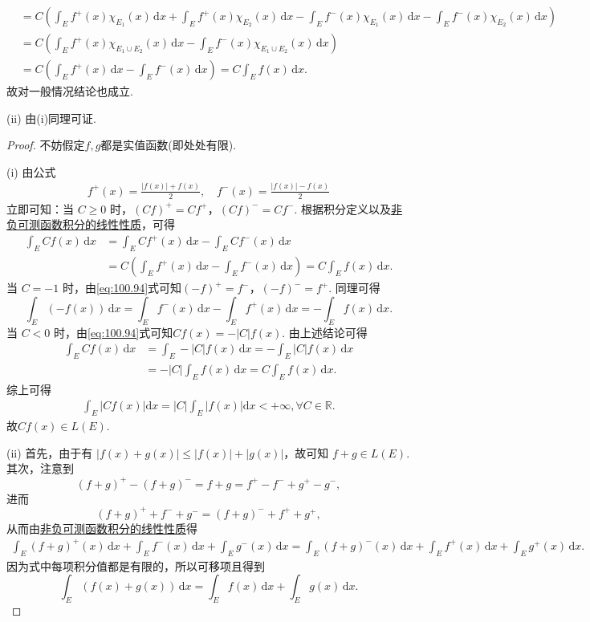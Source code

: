 \documentclass[../../main.tex]{subfiles}
\begin{document}
\begin{remark}
\begin{align*}
&= C \left( \int_E f^+(x) \chi_{E_1}(x) \, \mathrm{d}x + \int_E f^+(x) \chi_{E_2}(x) \, \mathrm{d}x - \int_E f^-(x) \chi_{E_1}(x) \, \mathrm{d}x - \int_E f^-(x) \chi_{E_2}(x) \, \mathrm{d}x \right) \\
&= C \left( \int_E f^+(x) \chi_{E_1 \cup E_2}(x) \, \mathrm{d}x - \int_E f^-(x) \chi_{E_1 \cup E_2}(x) \, \mathrm{d}x \right) \\
&= C \left( \int_E f^+(x) \, \mathrm{d}x - \int_E f^-(x) \, \mathrm{d}x \right) = C \int_E f(x) \, \mathrm{d}x.
\end{align*}
故对一般情况结论也成立.

(ii) 由(i)同理可证.
\end{remark}
\begin{proof}
不妨假定$f,g$都是实值函数(即处处有限).

(i) 由公式
\begin{align}\label{eq:100.94}
f^+(x) = \frac{|f(x)| + f(x)}{2}, \quad f^-(x) = \frac{|f(x)| - f(x)}{2}
\end{align}
立即可知：当 \( C \geqslant  0 \) 时，\( (Cf)^+ = Cf^+ \)，\( (Cf)^- = Cf^- \). 根据积分定义以及\hyperref[theorem:非负可测函数积分的线性性质]{非负可测函数积分的线性性质}，可得
\begin{align*}
\int_E Cf(x) \, \mathrm{d}x &= \int_E Cf^+(x) \, \mathrm{d}x - \int_E Cf^-(x) \, \mathrm{d}x \\
&= C \left( \int_E f^+(x) \, \mathrm{d}x - \int_E f^-(x) \, \mathrm{d}x \right) = C \int_E f(x) \, \mathrm{d}x.
\end{align*}
当 \( C = -1 \) 时，由\eqref{eq:100.94}式可知\( (-f)^+ = f^- \)，\( (-f)^- = f^+ \). 同理可得
\[
\int_E (-f(x)) \, \mathrm{d}x = \int_E f^-(x) \, \mathrm{d}x - \int_E f^+(x) \, \mathrm{d}x = - \int_E f(x) \, \mathrm{d}x.
\]
当 \( C < 0 \) 时，由\eqref{eq:100.94}式可知\( Cf(x) = -|C|f(x) \). 由上述结论可得
\begin{align*}
\int_E Cf(x) \, \mathrm{d}x &= \int_E -|C| f(x) \, \mathrm{d}x = - \int_E |C|f(x) \, \mathrm{d}x \\
&= -|C| \int_E f(x) \, \mathrm{d}x = C \int_E f(x) \, \mathrm{d}x.
\end{align*}
综上可得
\begin{align*}
\int_E{\left| Cf\left( x \right) \right|\mathrm{d}x}=\left| C \right|\int_E{\left| f\left( x \right) \right|\mathrm{d}x}<+\infty ,\forall C\in \mathbb{R} .
\end{align*}
故\( Cf(x)\in L(E) \).

(ii) 首先，由于有 \( |f(x) + g(x)| \leqslant  |f(x)| + |g(x)| \)，故可知 \( f + g \in L(E) \). 其次，注意到
\[
(f + g)^+ - (f + g)^- = f + g = f^+ - f^- + g^+ - g^-,
\]
进而
\[
(f + g)^+ + f^- + g^- = (f + g)^- + f^+ + g^+,
\]
从而由\hyperref[theorem:非负可测函数积分的线性性质]{非负可测函数积分的线性性质}得
\begin{align*}
\int_E (f + g)^+(x) \, \mathrm{d}x + \int_E f^-(x) \, \mathrm{d}x + \int_E g^-(x) \, \mathrm{d}x 
= \int_E (f + g)^-(x) \, \mathrm{d}x + \int_E f^+(x) \, \mathrm{d}x + \int_E g^+(x) \, \mathrm{d}x.
\end{align*}
因为式中每项积分值都是有限的，所以可移项且得到
\[
\int_E (f(x) + g(x)) \, \mathrm{d}x = \int_E f(x) \, \mathrm{d}x + \int_E g(x) \, \mathrm{d}x.
\]


\end{proof}
\end{document}
